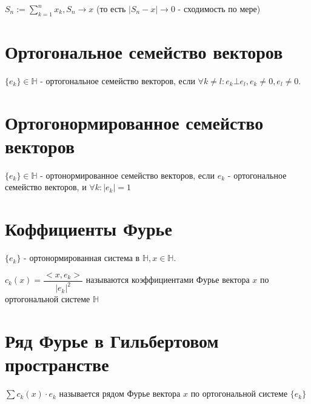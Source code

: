 \documentclass[paper=a4, fontsize=17pt]{article}
\begin{document}
$S_n := \sum\limits_{k = 1}^n x_k, S_n \rightarrow x$ (то есть $|S_n - x| \rightarrow 0$ - сходимость по мере) 

\section{Ортогональное семейство векторов}
$\{e_k\} \in \mathds{H}$ - ортогональное семейство векторов, если $\forall k \neq l: e_k \bot e_l, e_k \neq 0, e_l \neq 0$.

\section{Ортогонормированное семейство векторов}
$\{e_k\} \in \mathds{H}$ - ортонормированное семейство векторов, если ${e_k}$ - ортогональное семейство векторов, и $\forall k: |e_k| = 1 $

\section{Коффициенты Фурье}
$\{e_k\}$ - ортонормированная система в $\mathds{H}, x \in \mathds{H}$.

$c_k(x) = \dfrac{<x, e_k>}{|e_k|^2}$ называются коэффициентами Фурье вектора $x$ по ортогональной системе $\mathds{H}$

\section{Ряд Фурье в Гильбертовом пространстве}

$\sum c_k(x) \cdot e_k$ называется рядом Фурье вектора $x$ по ортогональной системе $\{e_k\}$
\end{document}
